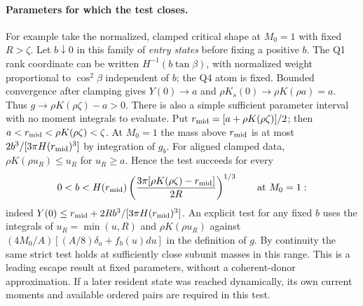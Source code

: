 \documentclass[11pt]{article}
\begin{document}
\paragraph{Parameters for which the test closes.}
For example take the normalized, clamped critical shape at \(M_0=1\)
with fixed \(R>\zeta\). Let \(b\downarrow0\) in this family of
\emph{entry states} before fixing a positive \(b\).
The Q1 rank coordinate can be written \(H^{-1}(b\tan\beta)\),
with normalized weight proportional to \(\cos^2\beta\) independent
of \(b\); the Q4 atom is fixed. Bounded convergence after clamping
gives \(Y(0)\to a\) and \(\rho K_s(0)\to\rho K(\rho a)=a\).
Thus \(g\to\rho K(\rho\zeta)-a>0\).
There is also a simple sufficient parameter interval with no moment
integrals to evaluate. Put \(r_{\rm mid}=[a+\rho K(\rho\zeta)]/2\);
then \(a<r_{\rm mid}<\rho K(\rho\zeta)<\zeta\). At \(M_0=1\)
the mass above \(r_{\rm mid}\) is at most
\(2b^3/[3\pi H(r_{\rm mid})^3]\) by integration of \(g_b\).
For aligned clamped data, \(\rho K(\rho u_R)\le u_R\) for \(u_R\ge a\).
Hence the test succeeds for every
\[
 0<b<H(r_{\rm mid})
 \left(\frac{3\pi[\rho K(\rho\zeta)-r_{\rm mid}]}{2R}\right)^{1/3}
 \qquad \text{at } M_0=1:
\]
indeed \(Y(0)\le r_{\rm mid}+2Rb^3/[3\pi H(r_{\rm mid})^3]\).
An explicit test for any fixed \(b\) uses the integrals of
\(u_R=\min(u,R)\) and \(\rho K(\rho u_R)\) against
\((4M_0/A)[(A/8)\delta_a+f_b(u)du]\) in the definition of \(g\).
By continuity the same strict test holds at sufficiently close
subunit masses in this range. This is a leading escape result at
fixed parameters, without a coherent-donor approximation.
If a later resident state was reached dynamically, its own current
moments and available ordered pairs are required in this test.
\end{document}
